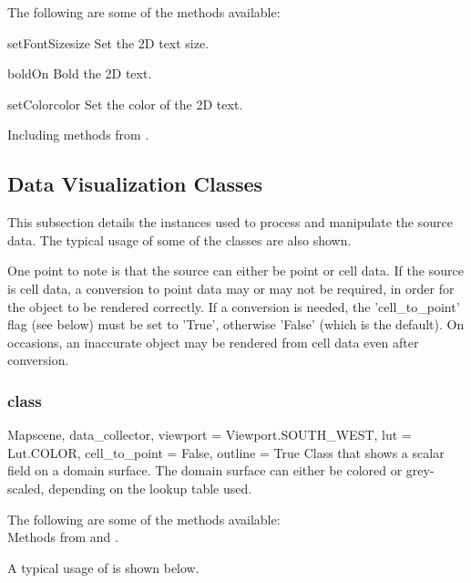 The following are some of the methods available:
\begin{methoddesc}[Text2D]{setFontSize}{size}
Set the 2D text size.
\end{methoddesc}

\begin{methoddesc}[Text2D]{boldOn}{}
Bold the 2D text.
\end{methoddesc}

\begin{methoddesc}[Text2D]{setColor}{color}
Set the color of the 2D text.
\end{methoddesc}

Including methods from \ActorTwoD. 




\subsection{Data Visualization Classes}
\label{DATAVIS SEC}
This subsection details the instances used to process and manipulate the source
data. The typical usage of some of the classes are also shown. 

One point to note is that the source can either be point or cell data. If the
source is cell data, a conversion to point data may or may not be
required, in order for the object to be rendered correctly.
If a conversion is needed, the 'cell_to_point' flag (see below) must 
be set to 'True', otherwise 'False' (which is the default). On occasions, an
inaccurate object may be rendered from cell data even after conversion.

\subsubsection{\Map class}

\begin{classdesc}{Map}{scene, data_collector, 
viewport = Viewport.SOUTH_WEST, lut = Lut.COLOR, cell_to_point = False,
outline = True}
Class that shows a scalar field on a domain surface. The domain surface 
can either be colored or grey-scaled, depending on the lookup table used.
\end{classdesc}

The following are some of the methods available:\\
Methods from \ActorThreeD and \DataSetMapper.

A typical usage of \Map is shown below.

